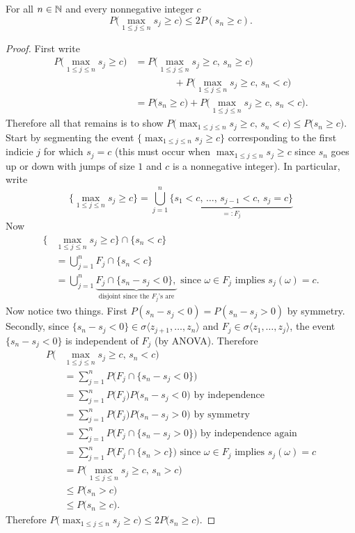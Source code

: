 \begin{lemma}
\label{LIL: usefull lemma 3}
For all $n\in\Bbb N$ and every nonnegative integer $c$
\[ P\bigl( \max_{1\leq j\leq n} s_j \geq c \bigr)\leq 2P(s_n\geq c).\]
\end{lemma}
\begin{proof}
First write
\begin{align*}
P\bigl( \max_{1\leq j\leq n} s_j \geq c \bigr)&= P\bigl( \max_{1\leq j\leq n} s_j \geq c,\, s_n \geq c \bigr) \\
&\qquad\qquad+ P\bigl( \max_{1\leq j\leq n} s_j \geq c,\, s_n < c  \bigr)\\
&= P\bigl( s_n \geq c \bigr) + P\bigl( \max_{1\leq j\leq n} s_j \geq c,\, s_n < c  \bigr).
\end{align*}
Therefore all that remains is to show $ P\bigl( \max_{1\leq j\leq n} s_j \geq c,\, s_n < c  \bigr)\leq  P\bigl( s_n \geq c \bigr)$.
Start by segmenting the event $\{\max_{1\leq j\leq n} s_j \geq c\}$ corresponding to the first indicie $j$ for which $s_j= c$ (this must occur when  $ \max_{1\leq j\leq n} s_j \geq c$ since $s_n$ goes up or down with jumps of size $1$ and $c$ is a nonnegative integer). In particular, write
\[ \{  \max_{1\leq j\leq n} s_j \geq c \} =\bigcup_{j=1}^n \underbrace{\{s_1<c, \, \ldots,\, s_{j-1}<c,\, s_j= c \}}_{=:F_j} \]
Now
\begin{align*}
\{ &\max_{1\leq j\leq n} s_j \geq c\}\cap\{s_n < c\}\\
&= \bigcup_{j=1}^n F_j\cap  \{s_n < c\}\\
&= \bigcup_{j=1}^n \underbrace{F_j\cap  \{s_n - s_j<0\},}_\text{disjoint since the $F_j$'s are}\text{ since $\omega\in F_j$ implies $s_j(\omega)=c$}.
\end{align*}
Now notice two things. First $P(s_n - s_j<0)=P(s_n - s_j>0) $ by symmetry. Secondly, since $\{s_n - s_j<0 \}\in \sigma\langle z_{j+1},\ldots, z_n\rangle$ and $F_j\in \sigma\langle z_1,\ldots, z_j\rangle$, the event $\{s_n - s_j<0 \}$ is independent of $F_j$ (by ANOVA).
Therefore
\begin{align*}
P\bigl( &\max_{1\leq j\leq n} s_j \geq c,\, s_n < c \bigr)\\
&= \sum_{j=1}^n P\bigl( F_j\cap  \{s_n - s_j<0\} \bigr)\\
& = \sum_{j=1}^n P\bigl( F_j\bigr)P\bigl( s_n - s_j<0 \bigr)\text{ by independence}\\
& = \sum_{j=1}^n P\bigl( F_j\bigr)P\bigl( s_n - s_j>0 \bigr)\text{ by symmetry}\\
& = \sum_{j=1}^n P\bigl( F_j \cap \{s_n - s_j>0\} \bigr)\text{ by independence again}\\
& = \sum_{j=1}^n P\bigl( F_j \cap \{s_n > c\} \bigr)\text{ since $\omega\in F_j$ implies $s_j(\omega)=c$}\\
&= P\bigl( \max_{1\leq j\leq n} s_j \geq c,\, s_n > c \bigr)\\
&\leq  P\bigl( s_n > c \bigr) \\
&\leq  P\bigl( s_n \geq c \bigr).
\end{align*}
Therefore $P\bigl( \max_{1\leq j\leq n} s_j \geq c \bigr)\leq 2 P\bigl( s_n \geq c \bigr)$.
\end{proof}



